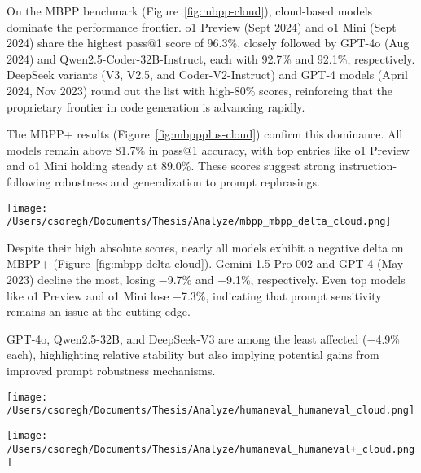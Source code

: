 On the \gls{MBPP} benchmark (Figure~\ref{fig:mbpp-cloud}), cloud-based models dominate the performance frontier. o1 Preview (Sept 2024) and o1 Mini (Sept 2024) share the highest pass@1 score of 96.3\%, closely followed by GPT-4o (Aug 2024) and Qwen2.5-Coder-32B-Instruct, each with 92.7\% and 92.1\%, respectively. DeepSeek variants (V3, V2.5, and Coder-V2-Instruct) and GPT-4 models (April 2024, Nov 2023) round out the list with high-80\% scores, reinforcing that the proprietary frontier in code generation is advancing rapidly.

The \gls{MBPP}+ results (Figure~\ref{fig:mbppplus-cloud}) confirm this dominance. All models remain above 81.7\% in pass@1 accuracy, with top entries like o1 Preview and o1 Mini holding steady at 89.0\%. These scores suggest strong instruction-following robustness and generalization to prompt rephrasings.

\begin{center}
	\texttt{[image: /Users/csoregh/Documents/Thesis/Analyze/mbpp\_mbpp\_delta\_cloud.png]}
	\label{fig:mbpp-delta-cloud}
\end{center}

Despite their high absolute scores, nearly all models exhibit a negative delta on \gls{MBPP}+ (Figure~\ref{fig:mbpp-delta-cloud}). Gemini 1.5 Pro 002 and GPT-4 (May 2023) decline the most, losing −9.7\% and −9.1\%, respectively. Even top models like o1 Preview and o1 Mini lose −7.3\%, indicating that prompt sensitivity remains an issue at the cutting edge.

GPT-4o, Qwen2.5-32B, and DeepSeek-V3 are among the least affected (−4.9\% each), highlighting relative stability but also implying potential gains from improved prompt robustness mechanisms.

\begin{center}
	\texttt{[image: /Users/csoregh/Documents/Thesis/Analyze/humaneval\_humaneval\_cloud.png]}
	\label{fig:humaneval-cloud}
\end{center}

\begin{center}
	\texttt{[image: /Users/csoregh/Documents/Thesis/Analyze/humaneval\_humaneval+\_cloud.png]}
	\label{fig:humanevalplus-cloud}
\end{center}

